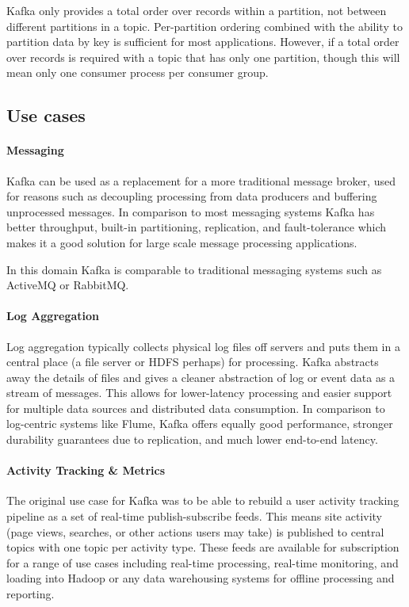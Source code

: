 Kafka only provides a total order over records within a partition, not between different partitions in a topic. Per-partition ordering combined with the ability to partition data by key is sufficient for most applications. However, if a total order over records is required with a topic that has only one partition, though this will mean only one consumer process per consumer group. 

\subsection{Use cases}

\paragraph{Messaging}

Kafka can be used as a replacement for a more traditional message broker, used for reasons such as decoupling processing from data producers and buffering unprocessed messages. In comparison to most messaging systems Kafka has better throughput, built-in partitioning, replication, and fault-tolerance which makes it a good solution for large scale message processing applications.

In this domain Kafka is comparable to traditional messaging systems such as ActiveMQ or RabbitMQ. 

\paragraph{Log Aggregation}

Log aggregation typically collects physical log files off servers and puts them in a central place (a file server or HDFS perhaps) for processing. Kafka abstracts away the details of files and gives a cleaner abstraction of log or event data as a stream of messages. This allows for lower-latency processing and easier support for multiple data sources and distributed data consumption. In comparison to log-centric systems like Flume, Kafka offers equally good performance, stronger durability guarantees due to replication, and much lower end-to-end latency. 
 
\paragraph{Activity Tracking \& Metrics}

The original use case for Kafka was to be able to rebuild a user activity tracking pipeline as a set of real-time publish-subscribe feeds. This means site activity (page views, searches, or other actions users may take) is published to central topics with one topic per activity type. These feeds are available for subscription for a range of use cases including real-time processing, real-time monitoring, and loading into Hadoop or any data warehousing systems for offline processing and reporting.

